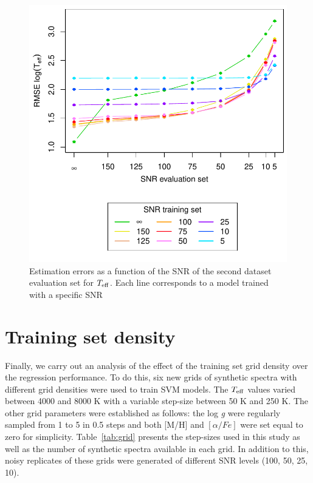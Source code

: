 \documentclass[a4paper,fleqn,usenatbib]{mnras}
\begin{document}
{{{\begin{figure}
\centering\includegraphics[width=\columnwidth]{snr_errors_log_global_HR21.pdf}
\caption{Estimation errors as a function of the SNR of the second 
	dataset evaluation set for $T_{\rm eff}$. Each line corresponds 
	to a model trained with a specific SNR}
\label{fig:snrtrainhr21}
\end{figure}


\section{Training set density}
\label{sec:comparison3}

Finally, we carry out an analysis of the effect of the training set
grid density over the regression performance.  To do this, six new
grids of synthetic spectra with different grid densities were used to
train SVM models. The $T_{\rm eff}$ values varied between 4000 and
8000 K with a variable step-size between 50 K and 250 K. The other
grid parameters were established as follows: the log \textit{g} were
regularly sampled from 1 to 5 in 0.5 steps and both [M/H] and $\left[
  \alpha/Fe \right]$ were set equal to zero for
simplicity. Table~\ref{tab:grid} presents the step-sizes used in this
study as well as the number of synthetic spectra available in each
grid.  In addition to this, noisy replicates of these grids were
generated of different SNR levels (100, 50, 25, 10).

}}}
\end{document}
